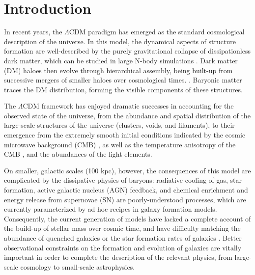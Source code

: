 \chapter{Introduction}

In recent years, the $\Lambda$CDM paradigm has emerged as the standard cosmological description of the universe.
In this model, the dynamical aspects of structure formation are well-described by the purely gravitational collapse of dissipationless dark matter, which can be studied in large N-body simulations \citep[e.g.,][]{Springel:2005aa,Thomas:1992aa,Navarro:1995aa,Weinberg:2004aa}.
Dark matter (DM) haloes then evolve through hierarchical assembly, being built-up from successive mergers of smaller haloes over cosmological times. \citep{Gott:1975ab,Press:1974aa,White:1978aa,Blumenthal:1984aa,Davis:1985aa,White:1991aa,Barnes:1992aa,Cole:2000aa}.
Baryonic matter traces the DM distribution, forming the visible components of these structures.

The $\Lambda$CDM framework has enjoyed dramatic successes in accounting for the observed state of the universe, from the abundance and spatial distribution of the large-scale structures of the universe (clusters, voids, and filaments), to their emergence from the extremely smooth initial conditions indicated by the cosmic microwave background (CMB) \citep{Springel:2006aa}, as well as the temperature anisotropy of the CMB \citep[][and references therein]{Narlikar:2001aa}, and the abundances of the light elements.

On smaller, galactic scales (100 kpc), however, the consequences of this model are complicated by the dissipative physics of baryons:
radiative cooling of gas, star formation, active galactic nucleus (AGN) feedback, and chemical enrichment and energy release from supernovae (SN) are poorly-understood processes, which are currently parameterized by ad hoc recipes in galaxy formation models.
Consequently, the current generation of models have lacked a complete account of the build-up of stellar mass over cosmic time, and have difficulty matching the abundance of quenched galaxies \citep[e.g.][]{Weinmann:2011aa,Vulcani:2014aa} or the star formation rates of galaxies \citep[e.g.][]{Font:2008ab,Weinmann:2010aa}.
Better observational constraints on the formation and evolution of galaxies are vitally important in order to complete the description of the relevant physics, from large-scale cosmology to small-scale astrophysics.

